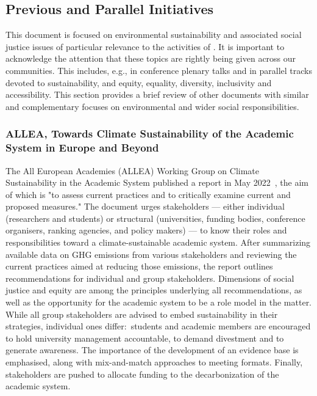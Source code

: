 \documentclass[../SustainableHEP.tex]{subfiles}
\begin{document}

\newpage

\subsection{Previous and Parallel Initiatives}
\label{sec:other_initiatives}

This document is focused on environmental sustainability and associated social justice issues of particular relevance to the activities of \ACR. It is important to acknowledge the attention that these topics are rightly being given across our communities. This includes, e.g., in conference plenary talks and in parallel tracks devoted to sustainability, and equity, equality, diversity, inclusivity and accessibility. This section provides a brief review of other documents with similar and complementary focuses on environmental and wider social responsibilities.


\subsubsection{ALLEA, Towards Climate Sustainability of the Academic System in Europe and Beyond}

The All European Academies (ALLEA) Working Group on Climate Sustainability in the Academic System published a report in May 2022~\cite{ALLEA}, the aim of which is "to  assess current practices and to critically examine current and proposed measures." 
The document urges stakeholders --- either individual (researchers and students) or structural (universities, funding bodies, conference organisers, ranking agencies, and
policy makers) --- to know their roles and responsibilities toward a climate-sustainable academic system.
After summarizing available data on GHG emissions from various stakeholders and reviewing
the current practices aimed at reducing those
emissions, the report outlines recommendations for individual and group stakeholders. 
Dimensions of social justice and equity are among the principles underlying all recommendations, as well as the opportunity for the academic system to be a role model in the matter. 
While all group stakeholders are advised to embed sustainability in their strategies, individual ones differ:\ students and academic members are encouraged to hold university management accountable, to demand divestment and to generate awareness. 
The importance of the development of an evidence base is emphasised, along with mix-and-match approaches to meeting formats. 
Finally, stakeholders are pushed to allocate funding to the decarbonization of the academic system.
\end{document}
